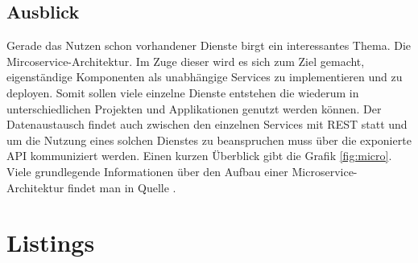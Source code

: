 \documentclass[fleqn,10.5pt,ngerman]{SelfArx}
\begin{document}
\subsection{Ausblick}
Gerade das Nutzen schon vorhandener Dienste birgt ein interessantes Thema. Die Mircoservice-Architektur. Im Zuge dieser wird es sich zum Ziel gemacht, eigenständige Komponenten als unabhängige Services zu implementieren und zu deployen. Somit sollen viele einzelne Dienste entstehen die wiederum in unterschiedlichen Projekten und Applikationen genutzt werden können. Der Datenaustausch findet auch zwischen den einzelnen Services mit REST statt und um die Nutzung eines solchen Dienstes zu beanspruchen muss über die exponierte API kommuniziert werden. Einen kurzen Überblick gibt die Grafik \ref{fig:micro}.
Viele grundlegende Informationen über den Aufbau einer Microservice-Architektur findet man in Quelle \cite{microservice}. 

\clearpage
\appendix
\cleardoublepage
\onecolumn
\newpage





\clearpage
\appendix
\cleardoublepage
\newpage
\onecolumn

\section{Listings}

\newpage

\newpage

\newpage
\end{document}
